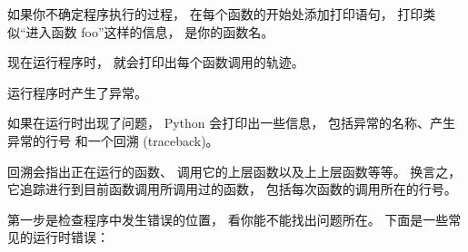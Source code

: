 
如果你不确定程序执行的过程， 在每个函数的开始处添加打印语句， 打印类似``进入函数 foo''这样的信息，  是你的函数名。  


现在运行程序时， 就会打印出每个函数调用的轨迹。  


运行程序时产生了异常。  



如果在运行时出现了问题， Python 会打印出一些信息， 包括异常的名称、产生异常的行号
和一个回溯 (traceback)。  


回溯会指出正在运行的函数、 调用它的上层函数以及上上层函数等等。  
换言之， 它追踪进行到目前函数调用所调用过的函数， 包括每次函数的调用所在的行号。  


第一步是检查程序中发生错误的位置， 看你能不能找出问题所在。  
下面是一些常见的运行时错误：

